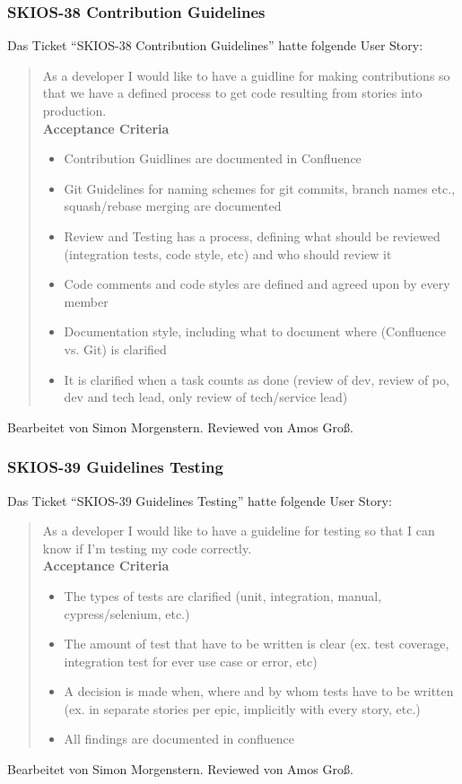 \subsubsection{SKIOS-38 Contribution Guidelines}
Das Ticket \enquote{SKIOS-38 Contribution Guidelines} hatte folgende User Story:
\begin{quotation}
    As a developer I would like to have a guidline for making contributions so that we have a defined process to get code resulting from stories into production. \\
\textbf{Acceptance Criteria}
\begin{itemize}
    \item Contribution Guidlines are documented in Confluence
    \item Git Guidelines for naming schemes for git commits, branch names etc., squash/rebase merging are documented
    \item Review and Testing has a process, defining what should be reviewed (integration tests, code style, etc) and who should review it
    \item Code comments and code styles are defined and agreed upon by every member
    \item Documentation style, including what to document where (Confluence vs. Git) is clarified
    \item It is clarified when a task counts as done (review of dev, review of po, dev and tech lead, only review of tech/service lead)
\end{itemize}
\end{quotation}
Bearbeitet von Simon Morgenstern.
Reviewed von Amos Groß.

\subsubsection{SKIOS-39 Guidelines Testing}
Das Ticket \enquote{SKIOS-39 Guidelines Testing} hatte folgende User Story:
\begin{quotation}
    As a developer I would like to have a guideline for testing so that I can know if I'm testing my code correctly. \\
\textbf{Acceptance Criteria}
\begin{itemize}
    \item The types of tests are clarified (unit, integration, manual, cypress/selenium, etc.)
    \item The amount of test that have to be written is clear (ex. test coverage, integration test for ever use case or error, etc)
    \item A decision is made when, where and by whom tests have to be written (ex. in separate stories per epic, implicitly with every story, etc.)
    \item All findings are documented in confluence
\end{itemize}
\end{quotation}
Bearbeitet von Simon Morgenstern.
Reviewed von Amos Groß.

